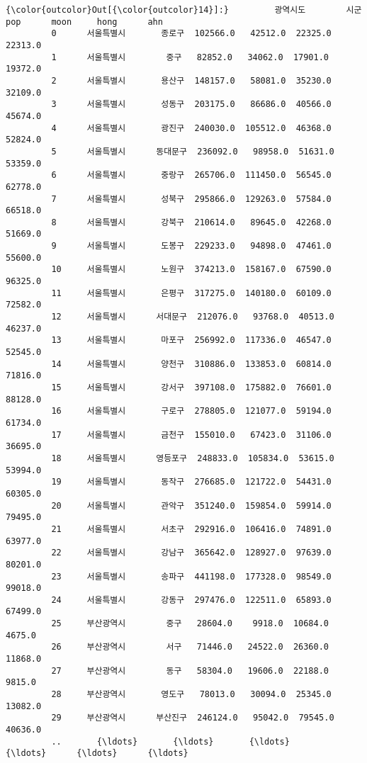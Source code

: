 \documentclass[11pt]{article}
\begin{document}
\begin{Verbatim}[commandchars=\\\{\}]
{\color{outcolor}Out[{\color{outcolor}14}]:}         광역시도        시군       pop      moon     hong      ahn
         0      서울특별시       종로구  102566.0   42512.0  22325.0  22313.0
         1      서울특별시        중구   82852.0   34062.0  17901.0  19372.0
         2      서울특별시       용산구  148157.0   58081.0  35230.0  32109.0
         3      서울특별시       성동구  203175.0   86686.0  40566.0  45674.0
         4      서울특별시       광진구  240030.0  105512.0  46368.0  52824.0
         5      서울특별시      동대문구  236092.0   98958.0  51631.0  53359.0
         6      서울특별시       중랑구  265706.0  111450.0  56545.0  62778.0
         7      서울특별시       성북구  295866.0  129263.0  57584.0  66518.0
         8      서울특별시       강북구  210614.0   89645.0  42268.0  51669.0
         9      서울특별시       도봉구  229233.0   94898.0  47461.0  55600.0
         10     서울특별시       노원구  374213.0  158167.0  67590.0  96325.0
         11     서울특별시       은평구  317275.0  140180.0  60109.0  72582.0
         12     서울특별시      서대문구  212076.0   93768.0  40513.0  46237.0
         13     서울특별시       마포구  256992.0  117336.0  46547.0  52545.0
         14     서울특별시       양천구  310886.0  133853.0  60814.0  71816.0
         15     서울특별시       강서구  397108.0  175882.0  76601.0  88128.0
         16     서울특별시       구로구  278805.0  121077.0  59194.0  61734.0
         17     서울특별시       금천구  155010.0   67423.0  31106.0  36695.0
         18     서울특별시      영등포구  248833.0  105834.0  53615.0  53994.0
         19     서울특별시       동작구  276685.0  121722.0  54431.0  60305.0
         20     서울특별시       관악구  351240.0  159854.0  59914.0  79495.0
         21     서울특별시       서초구  292916.0  106416.0  74891.0  63977.0
         22     서울특별시       강남구  365642.0  128927.0  97639.0  80201.0
         23     서울특별시       송파구  441198.0  177328.0  98549.0  99018.0
         24     서울특별시       강동구  297476.0  122511.0  65893.0  67499.0
         25     부산광역시        중구   28604.0    9918.0  10684.0   4675.0
         26     부산광역시        서구   71446.0   24522.0  26360.0  11868.0
         27     부산광역시        동구   58304.0   19606.0  22188.0   9815.0
         28     부산광역시       영도구   78013.0   30094.0  25345.0  13082.0
         29     부산광역시      부산진구  246124.0   95042.0  79545.0  40636.0
         ..       {\ldots}       {\ldots}       {\ldots}       {\ldots}      {\ldots}      {\ldots}

\end{Verbatim}
\end{document}
